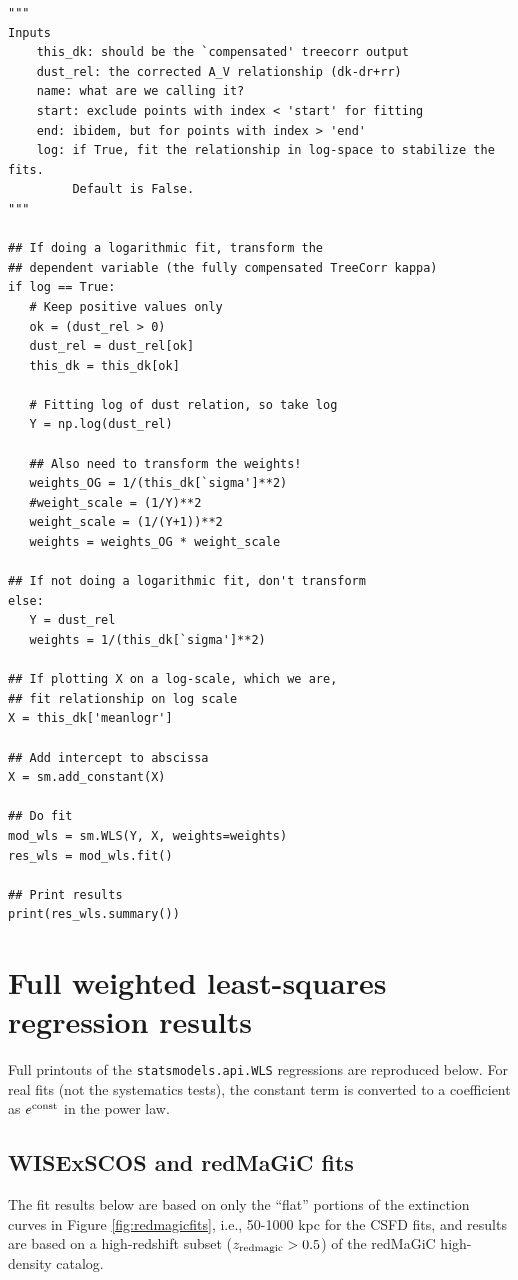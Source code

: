\documentclass[11pt, oneside]{article}   	%
\begin{document}
\small

\begin{verbatim}
"""
Inputs
    this_dk: should be the `compensated' treecorr output
    dust_rel: the corrected A_V relationship (dk-dr+rr)
    name: what are we calling it?
    start: exclude points with index < 'start' for fitting
    end: ibidem, but for points with index > 'end'
    log: if True, fit the relationship in log-space to stabilize the fits.
         Default is False.
"""

## If doing a logarithmic fit, transform the 
## dependent variable (the fully compensated TreeCorr kappa)
if log == True:
   # Keep positive values only
   ok = (dust_rel > 0)
   dust_rel = dust_rel[ok]
   this_dk = this_dk[ok]
   
   # Fitting log of dust relation, so take log
   Y = np.log(dust_rel)
   
   ## Also need to transform the weights!
   weights_OG = 1/(this_dk[`sigma']**2)
   #weight_scale = (1/Y)**2
   weight_scale = (1/(Y+1))**2
   weights = weights_OG * weight_scale

## If not doing a logarithmic fit, don't transform
else:
   Y = dust_rel
   weights = 1/(this_dk[`sigma']**2)

## If plotting X on a log-scale, which we are, 
## fit relationship on log scale
X = this_dk['meanlogr']

## Add intercept to abscissa
X = sm.add_constant(X)

## Do fit
mod_wls = sm.WLS(Y, X, weights=weights)
res_wls = mod_wls.fit()

## Print results
print(res_wls.summary())
\end{verbatim}
\normalsize 

\section{Full weighted least-squares regression results}

Full printouts of the \texttt{statsmodels.api.WLS} regressions are reproduced below. For real fits (not the systematics tests), the constant term is converted to a coefficient as $e ^ {\rm const}$ in the power law. 

\subsection{WISExSCOS and redMaGiC fits}

The fit results below are based on only the ``flat'' portions of the extinction curves in Figure \ref{fig:redmagicfits}, i.e., 50-1000 kpc for the CSFD fits, and results are based on a high-redshift subset ($z_{\rm redmagic} > 0.5$) of the redMaGiC high-density catalog.  
\end{document}
